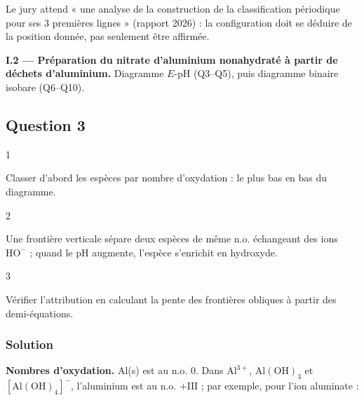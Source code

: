 \documentclass[11pt,a4paper]{article}
\newcommand{\equationajustee}[1]{%
  \sbox{\boiteequation}{$\displaystyle #1$}%
  \ifdim\wd\boiteequation>\linewidth
    \[\resizebox{\linewidth}{!}{\usebox{\boiteequation}}\]%
  \else
    \[#1\]%
  \fi}
\begin{document}
\begin{jury}

Le jury attend « une analyse de la construction de la classification périodique pour ses 3 premières lignes » (rapport 2026) : la configuration doit se déduire de la position donnée, pas seulement être affirmée.

\end{jury}

\textbf{I.2 --- Préparation du nitrate d'aluminium nonahydraté à partir de déchets d'aluminium.} Diagramme \(E\)-pH (Q3--Q5), puis diagramme binaire isobare (Q6--Q10).

\hypertarget{question-3}{%
\subsection{Question 3}\label{question-3}}

\begin{indication}{1}

Classer d'abord les espèces par nombre d'oxydation : le plus bas en bas du diagramme.

\end{indication}

\begin{indication}{2}

Une frontière verticale sépare deux espèces de même n.o. échangeant des ions \(\mathrm{HO^-}\) ; quand le pH augmente, l'espèce s'enrichit en hydroxyde.

\end{indication}

\begin{indication}{3}

Vérifier l'attribution en calculant la pente des frontières obliques à partir des demi-équations.

\end{indication}

\hypertarget{solution-2}{%
\subsubsection{Solution}\label{solution-2}}

\textbf{Nombres d'oxydation.} Al(s) est au n.o. 0. Dans \(\mathrm{Al^{3+}}\), \(\mathrm{Al(OH)_3}\) et \([\mathrm{Al(OH)_4}]^-\), l'aluminium est au n.o. \(+\mathrm{III}\) ; par exemple, pour l'ion aluminate :

\equationajustee{\begin{aligned}
x+4\times(-\mathrm{II})+4\times(+\mathrm I)&=-1\\
x&=+\mathrm{III}
\end{aligned}}
\end{document}
